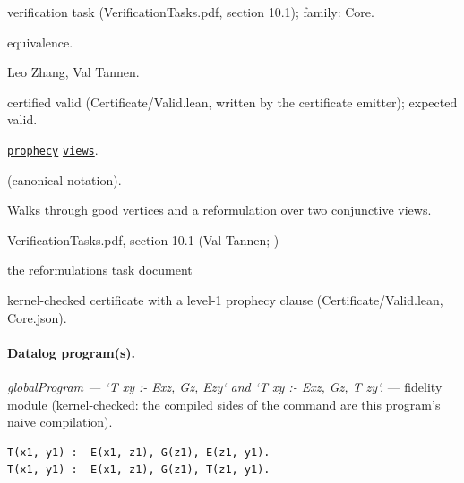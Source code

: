 \documentclass[10pt]{article}
\begin{document}
\begin{description}[leftmargin=2.6cm,style=nextline,itemsep=1pt]

\item[Category] verification task (VerificationTasks.pdf, section 10.1); family: Core.

\item[Kind] equivalence.

\item[Contributors] Leo Zhang, Val Tannen.

\item[Status] certified valid (Certificate/Valid.lean, written by the certificate emitter); expected valid.

\item[Tags] \hyperref[tag:prophecy]{\texttt{prophecy}} \hyperref[tag:views]{\texttt{views}}.

\item[Input]  (canonical notation).

\item[Summary] Walks through good vertices and a reformulation over two conjunctive views.

\item[Sources] {\raggedright VerificationTasks.pdf, section 10.1 (Val Tannen; ) \par the reformulations task document\par}

\item[Prophecy] kernel-checked certificate with a level-1 prophecy clause (Certificate/Valid.lean, Core.json).

\end{description}

\paragraph{Datalog program(s).}

{\raggedright\textit{globalProgram --- `T xy :- Exz, Gz, Ezy` and `T xy :- Exz, Gz, T zy`.} --- fidelity module (kernel-checked: the compiled sides of the command are this program's naive compilation).\par}

\begin{Verbatim}[fontsize=\scriptsize,breaklines=true,breakanywhere=true,frame=single,framesep=1.5mm]
T(x1, y1) :- E(x1, z1), G(z1), E(z1, y1).
T(x1, y1) :- E(x1, z1), G(z1), T(z1, y1).
\end{Verbatim}
\end{document}
